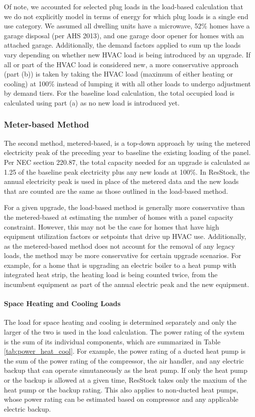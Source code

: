 Of note, we accounted for selected plug loads in the load-based calculation that we do not explicitly model in terms of energy for which plug loads is a single end use category. We assumed all dwelling units have a microwave, 52\% homes have a garage disposal (per AHS 2013), and one garage door opener for homes with an attached garage. Additionally, the demand factors applied to sum up the loads vary depending on whether new HVAC load is being introduced by an upgrade. If all or part of the HVAC load is considered new, a more conservative approach (part (b)) is taken by taking the HVAC load (maximum of either heating or cooling) at 100\% instead of lumping it with all other loads to undergo adjustment by demand tiers. For the baseline load calculation, the total occupied load is calculated using part (a) as no new load is introduced yet.

\subsubsection{Meter-based Method}
The second method, metered-based, is a top-down approach by using the metered electricity peak of the preceding year to baseline the existing loading of the panel. Per NEC section 220.87, the total capacity needed for an upgrade is calculated as 1.25 of the baseline peak electricity plus any new loads at 100\%. In ResStock, the annual electricity peak is used in place of the metered data and the new loads that are counted are the same as those outlined in the load-based method.

For a given upgrade, the load-based method is generally more conservative than the metered-based at estimating the number of homes with a panel capacity constraint. However, this may not be the case for homes that have high equipment utilization factors or setpoints that drive up HVAC use. Additionally, as the metered-based method does not account for the removal of any legacy loads, the method may be more conservative for certain upgrade scenarios. For example, for a home that is upgrading an electric boiler to a heat pump with integrated heat strip, the heating load is being counted twice, from the incumbent equipment as part of the annual electric peak and the new equipment.

\paragraph{Space Heating and Cooling Loads}
The load for space heating and cooling is determined separately and only the larger of the two is used in the load calculation. The power rating of the system is the sum of its individual components, which are summarized in Table \ref{tab:power_heat_cool}.
For example, the power rating of a ducted heat pump is the sum of the power rating of the compressor, the air handler, and any electric backup that can operate simutaneously as the heat pump. If only the heat pump or the backup is allowed at a given time, ResStock takes only the maxium of the heat pump or the backup rating. 
This also applies to non-ducted heat pumps, whose power rating can be estimated based on compressor and any applicable electric backup.

